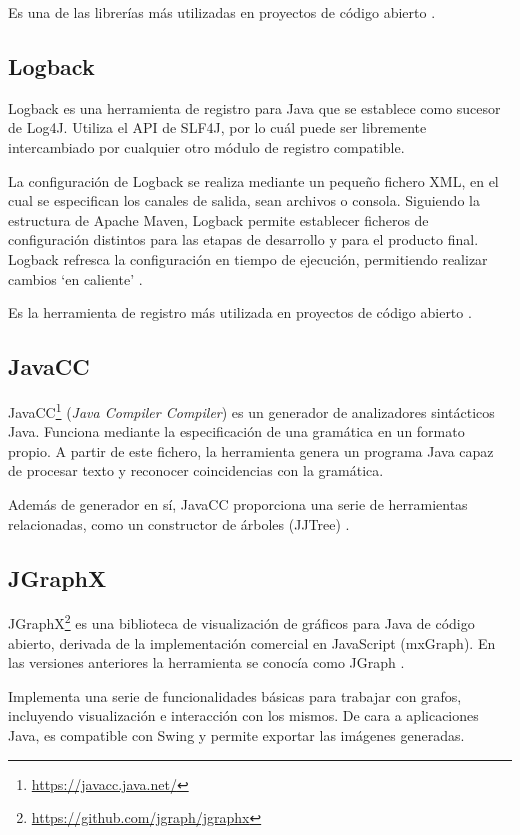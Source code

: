 Es una de las librerías más utilizadas en proyectos de código abierto \cite{website:githubTOP}.

\subsection{Logback}
Logback es una herramienta de registro para Java que se establece como sucesor de Log4J.
Utiliza el API de SLF4J, por lo cuál puede ser libremente intercambiado por cualquier otro módulo de registro compatible.

La configuración de Logback se realiza mediante un pequeño fichero XML, en el cual se especifican los canales de salida, sean archivos o consola.
Siguiendo la estructura de Apache Maven, Logback permite establecer ficheros de configuración distintos para las etapas de desarrollo y para el producto final.
Logback refresca la configuración en tiempo de ejecución, permitiendo realizar cambios `en caliente' \cite{website:logback}.

Es la herramienta de registro más utilizada en proyectos de código abierto \cite{website:githubTOP}.

\subsection{JavaCC}
JavaCC\footnote{\url{https://javacc.java.net/}} (\emph{Java Compiler Compiler}) es un generador de analizadores sintácticos Java.
Funciona mediante la especificación de una gramática en un formato propio.
A partir de este fichero, la herramienta genera un programa Java capaz de procesar texto y reconocer coincidencias con la gramática.

Además de generador en sí, JavaCC proporciona una serie de herramientas relacionadas, como un constructor de árboles (JJTree) \cite{website:javacc}.

\subsection{JGraphX}
JGraphX\footnote{\url{https://github.com/jgraph/jgraphx}} es una biblioteca de visualización de gráficos para Java de código abierto, derivada de la implementación comercial en JavaScript (mxGraph).
En las versiones anteriores la herramienta se conocía como JGraph \cite{website:jgraphx}.

Implementa una serie de funcionalidades básicas para trabajar con grafos, incluyendo visualización e interacción con los mismos.
De cara a aplicaciones Java, es compatible con Swing y permite exportar las imágenes generadas.

